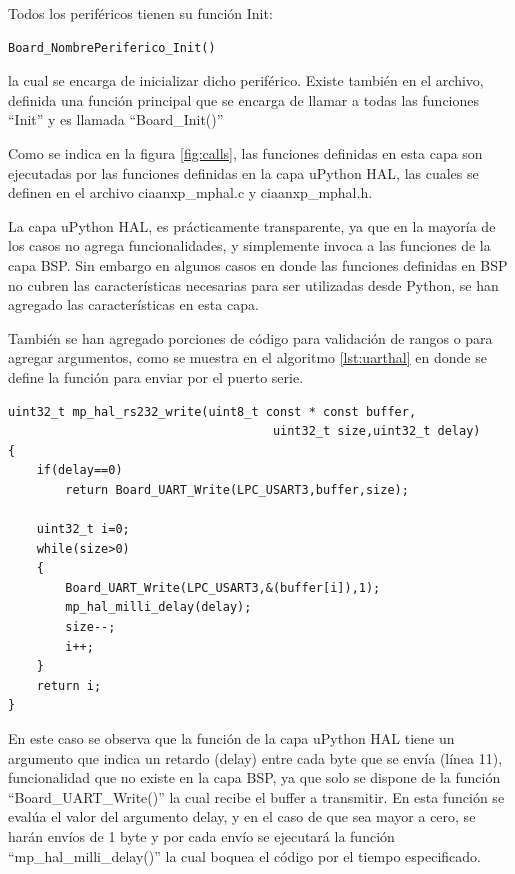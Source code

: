 Todos los periféricos tienen su función Init:
\begin{verbatim}
Board_NombrePeriferico_Init()
\end{verbatim}

la cual se encarga de inicializar dicho periférico. Existe también en el archivo, definida una función principal que se encarga de llamar a todas las funciones “Init” y es llamada “Board\_Init()”

Como se indica en la figura \ref{fig:calls}, las funciones definidas en esta capa son ejecutadas por las funciones definidas en la capa uPython HAL, las cuales se definen en el archivo ciaanxp\_mphal.c y ciaanxp\_mphal.h.

La capa uPython HAL, es prácticamente transparente, ya que en la mayoría de los casos no agrega funcionalidades, y simplemente invoca a las funciones de la capa BSP. 
Sin embargo en algunos casos en donde las funciones definidas en BSP no cubren las características necesarias para ser utilizadas desde Python, se han agregado las características en esta capa.

También se han agregado porciones de código para validación de rangos o para agregar argumentos, como se muestra en el algoritmo \ref{lst:uarthal} en donde se define la función para enviar por el puerto serie.

\begin{lstlisting}[label={lst:uarthal},caption=Función de envío por la UART de la capa uPython HAL] 
uint32_t mp_hal_rs232_write(uint8_t const * const buffer, 
                                     uint32_t size,uint32_t delay)
{
    if(delay==0)
        return Board_UART_Write(LPC_USART3,buffer,size);

    uint32_t i=0;
    while(size>0)
    {
        Board_UART_Write(LPC_USART3,&(buffer[i]),1);
        mp_hal_milli_delay(delay);
        size--;
        i++;
    }
    return i;
}
\end{lstlisting}

En este caso se observa que la función de la capa uPython HAL tiene un argumento que indica un retardo (delay) entre cada byte que se envía (línea 11), funcionalidad que no existe en la capa BSP, ya que solo se dispone de la función “Board\_UART\_Write()” la cual recibe el buffer a transmitir.
En esta función se evalúa el valor del argumento delay, y en el caso de que sea mayor a cero, se harán envíos de 1 byte y por cada envío se ejecutará la función “mp\_hal\_milli\_delay()” la cual boquea el código por el tiempo especificado.

